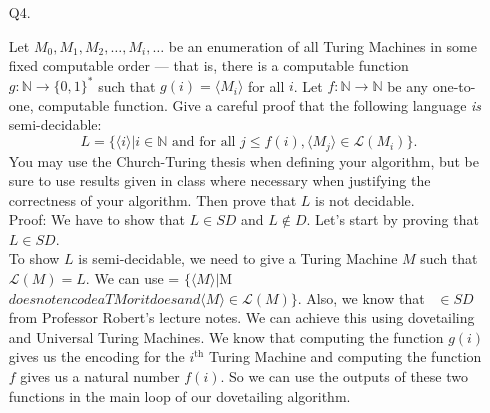 \documentclass{csc_assignment}
\begin{document}
\begin{description}
\begin{enumerate}
\begin{enumerate}
\begin{enumerate}
  \end{enumerate}





\newpage
\item[Q4.]


  Let $M_0, M_1, M_2, \ldots, M_i, \ldots$ be an enumeration of all Turing Machines in some fixed computable order --- that is, there is a computable function $g: \mathbb{N} \rightarrow \{0,1\}^*$ such that $g(i) = \langle M_i \rangle$ for all $i$.
  Let $f: \mathbb{N} \rightarrow \mathbb{N}$ be any one-to-one, computable function.
  Give a careful proof that the following language \emph{is} semi-decidable: \[ L = \{\langle i \rangle | i \in \mathbb{N} \text{ and for all } j \leq f(i), \langle{M_{j}}\rangle \in \mathcal{L}(M_i)\}.\]
  You may use the Church-Turing thesis when defining your algorithm, but be sure to use results given in class where necessary when justifying the correctness of your algorithm.
  Then prove that $L$ is not decidable.\\[4pt]
  Proof: We have to show that $L \in SD$ and $L \notin D$. Let's start by proving that $L \in SD$.\\
  To show $L$ is semi-decidable, we need to give a Turing Machine $M$ such that $\mathcal{L}(M) = L$. We can use  = $\{\langle M \rangle | $\langle M \rangle$ does not encode a TM or it does and \langle M \rangle \in \mathcal{L}(M)\}$. Also, we know that \ $\in SD$ from Professor Robert's lecture notes. We can achieve this using dovetailing and Universal Turing Machines. We know that computing the function $g(i)$ gives us the encoding for the $i^{\text{th}}$ Turing Machine and computing the function $f$ gives us a natural number $f(i)$. So we can use the outputs of these two functions in the main loop of our dovetailing algorithm.\\


\end{enumerate}
\end{enumerate}
\end{description}
\end{document}
